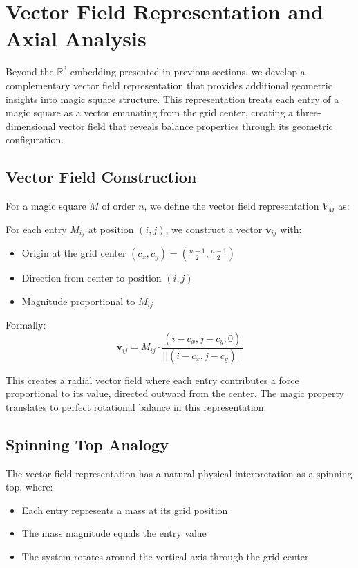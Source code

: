 \section{Vector Field Representation and Axial Analysis}\label{sec:vector-field}

Beyond the $\mathbb{R}^3$ embedding presented in previous sections, we develop a complementary vector field representation that provides additional geometric insights into magic square structure. This representation treats each entry of a magic square as a vector emanating from the grid center, creating a three-dimensional vector field that reveals balance properties through its geometric configuration.

\subsection{Vector Field Construction}

For a magic square $M$ of order $n$, we define the vector field representation $V_M$ as:

\begin{definition}
For each entry $M_{ij}$ at position $(i,j)$, we construct a vector $\mathbf{v}_{ij}$ with:
\begin{itemize}
    \item Origin at the grid center $(c_x, c_y) = \left(\frac{n-1}{2}, \frac{n-1}{2}\right)$
    \item Direction from center to position $(i,j)$
    \item Magnitude proportional to $M_{ij}$
\end{itemize}
Formally:
\[\mathbf{v}_{ij} = M_{ij} \cdot \frac{(i-c_x, j-c_y, 0)}{||(i-c_x, j-c_y)||}\]
\end{definition}

This creates a radial vector field where each entry contributes a force proportional to its value, directed outward from the center. The magic property translates to perfect rotational balance in this representation.

\subsection{Spinning Top Analogy}

The vector field representation has a natural physical interpretation as a spinning top, where:
\begin{itemize}
    \item Each entry represents a mass at its grid position
    \item The mass magnitude equals the entry value
    \item The system rotates around the vertical axis through the grid center
\end{itemize}

